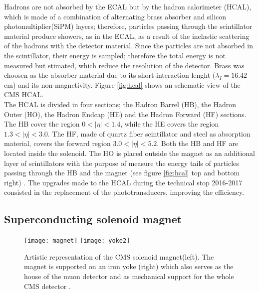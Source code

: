 \noindent Hadrons are not absorbed by the ECAL but by the hadron calorimeter (HCAL), which is made of a combination of alternating brass absorber and silicon photomultiplier(SiPM) layers; therefore, particles passing through the scintillator material produce showers, as in the ECAL, as a result of the inelastic scattering of the hadrons with the detector material. Since the particles are not absorbed in the scintillator, their energy is sampled; therefore the total energy is not measured but stimated, which reduce the resolution of the detector. Brass was choosen as the absorber material due to its short interaction lenght ($\lambda_I=16.42$cm) and its non-magnetivity. Figure \ref{fig:hcal} shows an schematic view of the CMS HCAL.\\

\noindent The HCAL is divided in four sections; the Hadron Barrel (HB), the Hadron Outer (HO), the Hadron Endcap (HE) and the Hadron Forward (HF) sections. The HB cover the region $0<|\eta|<1.4$, while the HE covers the region $1.3<|\eta|<3.0$. The HF, made of quartz fiber scintillator and steel as absorption material, covers the forward region $3.0<|\eta|<5.2$. Both the HB and HF are located inside the solenoid. The HO is placed outside the magnet as an additional layer of scintillators with the purpose of measure the energy tails of particles passing through the HB and the magnet (see figure \ref{fig:hcal} top and bottom right) . The upgrades made to the HCAL during the technical stop 2016-2017 consisted in the replacement of the phototransducers, improving the efficiency.

\subsection{Superconducting solenoid magnet}

\begin{figure}[h!]
  \centering
  \texttt{[image: magnet]}
  \texttt{[image: yoke2]}
  \caption[CMS solenoid magnet]{Artistic representation of the CMS solenoid magnet(left). The magnet is supported on an iron yoke (right) which also serves as the house of the muon detector and as mechanical support for the whole CMS detector \cite{yoke2}.}
  \label{fig:yoke}
\end{figure}

